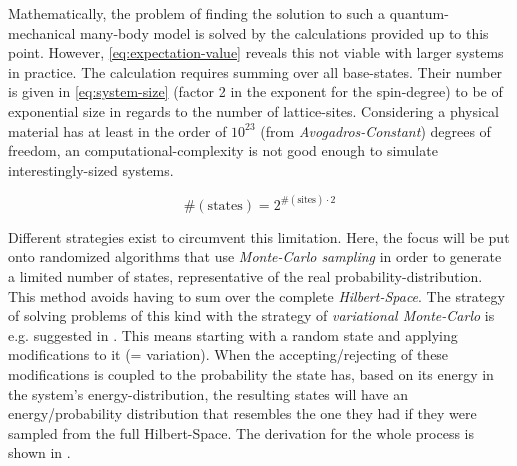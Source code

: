 Mathematically, the problem of finding the solution to such a quantum-mechanical many-body model is solved by the calculations provided up to this point. 
However, \autoref{eq:expectation-value} reveals this not viable with larger systems in practice. 
The calculation requires summing over all base-states. 
Their number is given in \autoref{eq:system-size} (factor 2 in the exponent for the spin-degree) to be of exponential size in regards to the number of lattice-sites.
Considering a physical material has at least in the order of $10^{23}$ (from \emph{Avogadros-Constant}) degrees of freedom, an  computational-complexity is not good enough to simulate interestingly-sized systems. 

\begin{equation}
    \label{eq:system-size}
    \text{\#}(\text{states}) = 2^{\text{\#}(\text{sites}) \cdot 2}
\end{equation}

Different strategies exist to circumvent this limitation.
Here, the focus will be put onto randomized algorithms that use \emph{Monte-Carlo sampling} in order to generate a limited number of states, representative of the real probability-distribution.
This method avoids having to sum over the complete \emph{Hilbert-Space}.
The strategy of solving problems of this kind with the strategy of \emph{variational Monte-Carlo} is e.g. suggested in \cite{metropolisAlgorithmAndVariationalMonteCarlo}.
This means starting with a random state and applying modifications to it (= variation).
When the accepting/rejecting of these modifications is coupled to the probability the state has, based on its energy in the system's energy-distribution, the resulting states will have an energy/probability distribution that resembles the one they had if they were sampled from the full Hilbert-Space.
The derivation for the whole process is shown in \cite{monteCarloObservableSampling}.

